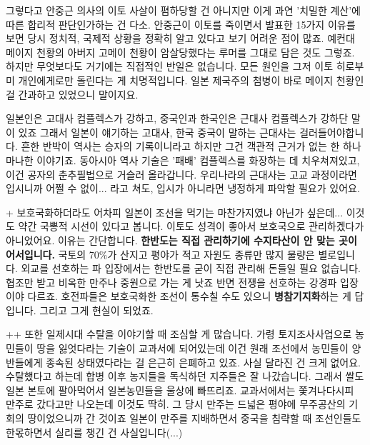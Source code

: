 그렇다고 안중근 의사의 이토 사살이 폄하당할 건 아니지만 이게 과연 '치밀한 계산'에 따른 합리적 판단인가하는 건 다소.
안중근이 이토를 죽이면서 발표한 15가지 이유를 보면 당시 정치적, 국제적 상황을 정확히 알고 있다고 보기 어려운 점이 많죠.
예컨대 메이지 천황의 아버지 고메이 천황이 암살당했다는 루머를 그대로 담은 것도 그렇죠.
하지만 무엇보다도 거기에는 직접적인 반일은 없습니다. 모든 원인을 그저 이토 히로부미 개인에게로만 돌린다는 게 치명적입니다.
일본 제국주의 첨병이 바로 메이지 천황인 걸 간과하고 있었으니 말이지요.
\vspace{5mm}

일본인은 고대사 컴플렉스가 강하고, 중국인과 한국인은 근대사 컴플렉스가 강하단 말이 있죠
그래서 일본이 얘기하는 고대사, 한국 중국이 말하는 근대사는 걸러들어야합니다.
흔한 반박이 역사는 승자의 기록이니라고 하지만 그건 객관적 근거가 없는 한 하나마나한 이야기죠.
동아시아 역사 기술은 '패배' 컴플렉스를 화장하는 데 치우쳐져있고, 이건 공자의 춘추필법으로 거슬러 올라갑니다.
우리나라의 근대사는 고교 과정이라면 입시니까 어쩔 수 없이... 라고 쳐도, 입시가 아니라면 냉정하게 파악할 필요가 있어요.
\vspace{5mm}

+ 보호국화하더라도 어차피 일본이 조선을 먹기는 마찬가지였냐 아닌가 싶은데... 이것도 약간 국뽕적 시선이 있다고 봅니다.
이토도 성격이 좋아서 보호국으로 관리하겠다가 아니었어요. 이유는 간단합니다.
\textbf{한반도는 직접 관리하기에 수지타산이 안 맞는 곳이어서입니다.}
국토의 70$\%$가 산지고 평야가 적고 자원도 종류만 많지 물량은 별로입니다.
외교를 선호하는 파 입장에서는 한반도를 굳이 직접 관리해 돈들일 필요 없습니다. 협조만 받고 비옥한 만주나 중원으로 가는 게 낫죠
반면 전쟁을 선호하는 강경파 입장이야 다르죠. 호전파들은 보호국화한 조선이 통수칠 수도 있으니 \textbf{병참기지화}하는 게 답입니다.
그리고 그게 현실이 되었죠.
\vspace{5mm}

++ 또한 일제시대 수탈을 이야기할 때 조심할 게 많습니다. 가령 토지조사사업으로 농민들이 땅을 잃엇다라는 기술이 교과서에 되어있는데
이건 원래 조선에서 농민들이 양반들에게 종속된 상태였다라는 걸 은근히 은폐하고 있죠. 사실 달라진 건 크게 없어요.
수탈했다고 하는데 합병 이후 농지들을 독식하던 지주들은 잘 나갔습니다. 그래서 쌀도 일본 본토에 팔아먹어서 일본농민들을 울상에 빠뜨리죠.
교과서에서는 쫓겨나다시피 만주로 갔다고만 나오는데 이것도 딱히. 그 당시 만주는 드넓은 평야에 무주공산의 기회의 땅이었으니까 간 것이죠
일본이 만주를 지배하면서 중국을 침략할 때 조선인들도 한몫하면서 실리를 챙긴 건 사실입니다(...)
\vspace{5mm}

